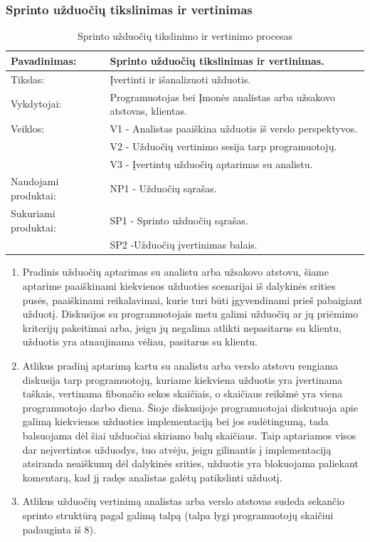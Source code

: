 \documentclass{VUMIFPSkursinis}
\begin{document}
	\subsubsection{Sprinto užduočių tikslinimas ir vertinimas}
	\begin{center}
		\begin{table}[ht]
			\caption{Sprinto užduočių tikslinimo ir vertinimo procesas}
			\begin{tabular}{ | l | l | }
				\hline
				Pavadinimas:		& Sprinto užduočių tikslinimas ir vertinimas.				\\ \hline
				Tikslas: 		& Įvertinti ir išanalizuoti užduotis.					\\ \hline
				Vykdytojai:		& Programuotojas bei Įmonės analistas arba užsakovo atstovas, klientas.	\\ \hline
				Veiklos:		& V1 - Analistas paaiškina užduotis iš verslo perspektyvos. 		\\
							& V2 - Užduočių vertinimo sesija tarp programuotojų.			\\
							& V3 - Įvertintų užduočių aptarimas su analistu. 			\\ \hline
				Naudojami produktai:	& NP1 - Užduočių sąrašas. 						\\ \hline
				Sukuriami produktai:	& SP1 - Sprinto užduočių sąrašas. 					\\
							& SP2 -Užduočių įvertinimas balais.					\\ \hline
			\end{tabular}
		\end{table}
	\end{center}

	\begin{enumerate}
		\item{
			Pradinis užduočių aptarimas su analistu arba užsakovo atstovu, šiame aptarime paaiškinami kiekvienos užduoties scenarijai iš dalykinės srities pusės, paaiškinami reikalavimai, kurie turi būti įgyvendinami prieš pabaigiant užduotį.
			Diskusijos su programuotojais metu galimi užduočių ar jų priėmimo kriterijų pakeitimai arba, jeigu jų negalima atlikti nepasitarus su klientu, užduotis yra atnaujinama vėliau, pasitarus su klientu.
		}
		\item{
			Atlikus pradinį aptarimą kartu su analistu arba verslo atstovu rengiama diskusija tarp programuotojų, kuriame kiekviena užduotis yra įvertinama taškais, vertinama fibonačio sekos skaičiais, o skaičiaus reikšmė yra viena programuotojo darbo diena.
			Šioje diskusijoje programuotojai diskutuoja apie galimą kiekvienos užduoties implementaciją bei jos sudėtingumą, tada balsuojama dėl šiai užduočiai skiriamo balų skaičiaus.
			Taip aptariamos visos dar neįvertintos užduodys, tuo atvėju, jeigu gilinantis į implementaciją atsiranda neaiškumų dėl dalykinės srities, užduotis yra blokuojama paliekant komentarą, kad jį radęs analistas galėtų patikslinti užduotį.
		}
		\item{Atlikus užduočių vertinimą analistas arba verslo atstovas sudeda sekančio sprinto struktūrą pagal galimą talpą (talpa lygi programuotojų skaičiui padauginta iš 8).}
	\end{enumerate}
\end{document}
